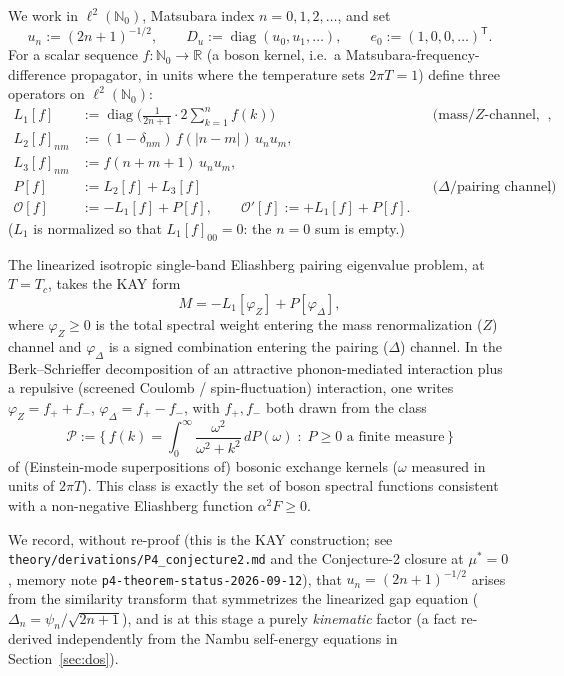 \documentclass[11pt]{article}
\newcommand{\OO}{\mathcal{O}}
\newcommand{\PP}{\mathcal{P}}
\DeclareMathOperator{\diag}{diag}
\begin{document}
We work in $\ell^2(\mathbb N_0)$, Matsubara index $n=0,1,2,\dots$, and set
\[
 u_n:=(2n+1)^{-1/2},\qquad D_u:=\diag(u_0,u_1,\dots),\qquad e_0:=(1,0,0,\dots)^{\mathsf T}.
\]
For a scalar sequence $f:\mathbb N_0\to\mathbb R$ (a boson kernel, i.e.\ a
Matsubara-frequency-difference propagator, in units where the temperature
sets $2\pi T=1$) define three operators on $\ell^2(\mathbb N_0)$:
\begin{align}
 L_1[f] &:= \diag\!\Big(\tfrac{1}{2n+1}\cdot 2\textstyle\sum_{k=1}^n f(k)\Big)
 &&\text{(mass/$Z$-channel, diagonal)},\label{eq:L1}\\
 L_2[f]_{nm} &:= (1-\delta_{nm})\,f(|n-m|)\,u_n u_m, &&\\
 L_3[f]_{nm} &:= f(n+m+1)\,u_n u_m, &&\\
 P[f] &:= L_2[f]+L_3[f] &&\text{($\Delta$/pairing channel)},\\
 \OO[f] &:= -L_1[f]+P[f], \qquad \OO'[f]:=+L_1[f]+P[f]. &&
\end{align}
($L_1$ is normalized so that $L_1[f]_{00}=0$: the $n=0$ sum is empty.)

The linearized isotropic single-band Eliashberg pairing eigenvalue problem, at
$T=T_c$, takes the KAY form
\begin{equation}\label{eq:M}
 M = -L_1[\varphi_Z] + P[\varphi_\Delta],
\end{equation}
where $\varphi_Z\ge 0$ is the total spectral weight entering the mass
renormalization ($Z$) channel and $\varphi_\Delta$ is a signed combination
entering the pairing ($\Delta$) channel. In the Berk--Schrieffer
decomposition of an attractive phonon-mediated interaction plus a repulsive
(screened Coulomb / spin-fluctuation) interaction, one writes
$\varphi_Z=f_++f_-$, $\varphi_\Delta=f_+-f_-$, with $f_+,f_-$ both drawn from
the class
\begin{equation}\label{eq:P-class}
 \PP:=\Big\{\,f(k)=\int_0^\infty \frac{\omega^2}{\omega^2+k^2}\,dP(\omega)\;:\;P\ge0\text{ a finite measure}\,\Big\}
\end{equation}
of (Einstein-mode superpositions of) bosonic exchange kernels ($\omega$
measured in units of $2\pi T$). This class is exactly the set of boson
spectral functions consistent with a non-negative Eliashberg function
$\alpha^2F\ge0$.

We record, without re-proof (this is the KAY construction; see
\texttt{theory/derivations/P4\_conjecture2.md} and the Conjecture-2 closure at
$\mu^*=0$, memory note \texttt{p4-theorem-status-2026-09-12}), that
$u_n=(2n+1)^{-1/2}$ arises from the similarity transform that symmetrizes the
linearized gap equation ($\Delta_n=\psi_n/\sqrt{2n+1}$), and is at this stage
a purely \emph{kinematic} factor (a fact re-derived independently from the
Nambu self-energy equations in Section~\ref{sec:dos}).
\end{document}
